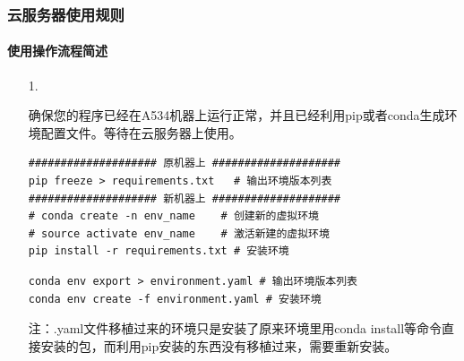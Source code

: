 \documentclass[10pt]{beamer}
\begin{document}
        \begin{frame}[fragile]
            \frametitle{云服务器使用规则}
                \framesubtitle{使用操作流程简述}


                    \begin{itemize}
                        \item [1. ]{
                            确保您的程序已经在A534机器上运行正常，并且已经利用pip或者conda生成环境配置文件。等待在云服务器上使用。\\
                            \begin{lstlisting}
#################### 原机器上 ####################
pip freeze > requirements.txt   # 输出环境版本列表
#################### 新机器上 ####################
# conda create -n env_name    # 创建新的虚拟环境
# source activate env_name    # 激活新建的虚拟环境
pip install -r requirements.txt # 安装环境
                            \end{lstlisting}
                            
                            \begin{lstlisting}
conda env export > environment.yaml # 输出环境版本列表
conda env create -f environment.yaml # 安装环境
                            \end{lstlisting}
                            {\small
                            注：.yaml文件移植过来的环境只是安装了原来环境里用conda install等命令直接安装的包，而利用pip安装的东西没有移植过来，需要重新安装。 \\}
                        }
                    \end{itemize}
        \end{frame}
\end{document}
